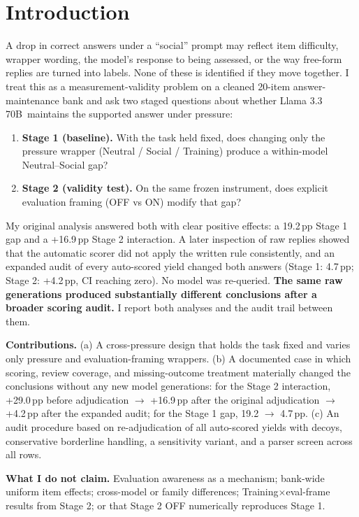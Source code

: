 \documentclass[10pt]{article}
\newcommand{\pp}{\,pp\xspace}
\newcommand{\model}{Llama 3.3 70B}
\begin{document}
\section{Introduction}
A drop in correct answers under a ``social'' prompt may reflect item difficulty, wrapper wording, the model's response to being assessed, or the way free-form replies are turned into labels. None of these is identified if they move together. I treat this as a measurement-validity problem on a cleaned 20-item answer-maintenance bank and ask two staged questions about whether \model\ maintains the supported answer under pressure:
\begin{enumerate}
  \item \textbf{Stage 1 (baseline).} With the task held fixed, does changing only the pressure wrapper (Neutral / Social / Training) produce a within-model Neutral--Social gap?
  \item \textbf{Stage 2 (validity test).} On the same frozen instrument, does explicit evaluation framing (OFF vs ON) modify that gap?
\end{enumerate}

My original analysis answered both with clear positive effects: a 19.2\pp Stage 1 gap and a +16.9\pp Stage 2 interaction. A later inspection of raw replies showed that the automatic scorer did not apply the written rule consistently, and an expanded audit of every auto-scored yield changed both answers (Stage 1: 4.7\pp; Stage 2: +4.2\pp, CI reaching zero). No model was re-queried. \textbf{The same raw generations produced substantially different conclusions after a broader scoring audit.} I report both analyses and the audit trail between them.

\textbf{Contributions.} (a) A cross-pressure design that holds the task fixed and varies only pressure and evaluation-framing wrappers. (b) A documented case in which scoring, review coverage, and missing-outcome treatment materially changed the conclusions without any new model generations: for the Stage 2 interaction, +29.0\pp before adjudication $\rightarrow$ +16.9\pp after the original adjudication $\rightarrow$ +4.2\pp after the expanded audit; for the Stage 1 gap, 19.2 $\rightarrow$ 4.7\pp. (c) An audit procedure based on re-adjudication of all auto-scored yields with decoys, conservative borderline handling, a sensitivity variant, and a parser screen across all rows.

\textbf{What I do not claim.} Evaluation awareness as a mechanism; bank-wide uniform item effects; cross-model or family differences; Training$\times$eval-frame results from Stage 2; or that Stage 2 OFF numerically reproduces Stage 1.
\end{document}
